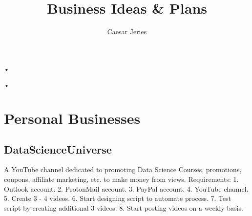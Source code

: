 
•\author{Caesar Jeries}
•\title{Business Ideas & Plans}
\section{ Personal Businesses}
\subsection{DataScienceUniverse}
A YouTube channel dedicated to promoting Data Science Courses, promotions, coupons, affiliate marketing, etc. to make money from views.
Requirements:
1. Outlook account.
2. ProtonMail account.
3. PayPal account.
4. YouTube channel.
5. Create 3 - 4 videos.
6. Start designing script to automate process.
7. Test script by creating additional 3 videos.
8. Start posting videos on a weekly basis.


